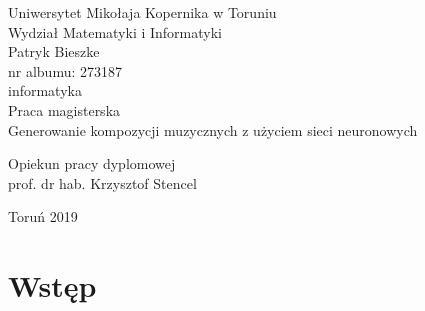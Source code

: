 \documentclass[12pt,a4paper,twoside]{mwart}
\begin{document}
\begin{titlepage}
	\begin{center}
		\large Uniwersytet Mikołaja Kopernika w Toruniu\\
		\large Wydział Matematyki i Informatyki\\
		\vspace{3cm} 
		\large Patryk Bieszke\\
			nr albumu: 273187\\
			informatyka\\
		\vspace{2cm}
		Praca magisterska\\
	
		\vspace{2cm} 
		\huge Generowanie kompozycji muzycznych z użyciem sieci neuronowych\\
	\end{center}
	\hfill
	\begin{minipage}{6cm}
		\vspace{2cm}
		Opiekun pracy dyplomowej\\
		prof. dr hab. Krzysztof Stencel
	\end{minipage}
	\vspace{3cm}
	\begin{center}
		Toruń 2019\\
	\end{center}
\end{titlepage}



\clearpage
\thispagestyle{empty}
\mbox{}

\tableofcontents 
\clearpage

\setcounter{secnumdepth}{0}
\section{Wstęp}
\label{sec:wstep}

\newpage
\end{document}
